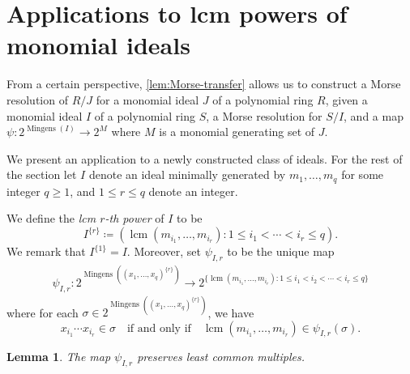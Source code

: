 \documentclass[reqno]{amsart}
\DeclareMathOperator{\lcm}{lcm}
\DeclareMathOperator{\mingens}{Mingens}
\newcommand{\qand}{\quad \mbox{and} \quad }
\newcommand{\qforsome}{\quad \mbox{for some} \quad }
\newtheorem{lemma}[theorem]{Lemma}
\theoremstyle{definition}
\theoremstyle{remark}
\numberwithin{equation}{section}
\begin{document}





\section{Applications to lcm powers of monomial ideals}

From a certain perspective, \cref{lem:Morse-transfer} allows us to construct a Morse resolution of $R/J$ for a monomial ideal $J$ of a polynomial ring $R$, given a monomial ideal $I$ of a polynomial ring $S$, a Morse resolution for $S/I$, and a map $\psi\colon 2^{\mingens(I)}\to 2^{M}$ where $M$ is a monomial generating set of $J$. 

We present an application to a newly constructed class of ideals. For the rest of the section let $I$ denote an ideal minimally generated by $m_1,\dots, m_q$ for some integer $q\geq 1$, and $1\leq r\leq q$ denote an integer. 

We  define the \textit{lcm $r$-th power} of $I$ to be
\[
I^{\{r\}}\coloneqq (\lcm(m_{i_1},\dots, m_{i_r}) \colon 1\leq i_1<\cdots <i_r\leq q). 
\]
We remark that $I^{\{1\}}=I$. Moreover, set $\psi_{I,r}$ to be the unique map
\begin{align*}
    \psi_{I,r}:2^{ \mingens((x_1,\dots, x_q)^{\{r\}}) } \to 2^{ \{\lcm(m_{i_1},\dots, m_{i_r})\colon 1\leq i_1<i_2<\cdots < i_r\leq q\} }
\end{align*}
where for each $\sigma\in 2^{ \mingens((x_1,\dots, x_q)^{\{r\}})}$, we have \[
x_{i_1}\cdots x_{i_r} \in \sigma \quad \text{if and only if}  \quad\lcm(m_{i_1},\dots, m_{i_r})\in \psi_{I,r}(\sigma).
\]
\begin{lemma}\label{lem:psi-I-r-lcm-preserve}
    The map $\psi_{I,r}$ preserves least common multiples.
\end{lemma}
\end{document}
